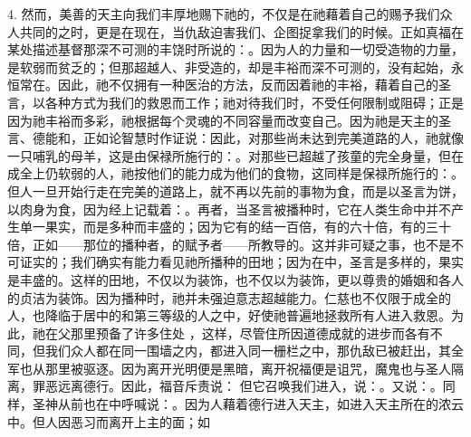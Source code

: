 4. 然而，美善的天主向我们丰厚地赐下祂的，不仅是在祂藉着自己的赐予我们众人共同的之时，更是在现在，当仇敌迫害我们、企图捉拿我们的时候。正如真福在某处描述基督那深不可测的丰饶时所说的：。因为人的力量和一切受造物的力量，是软弱而贫乏的；但那超越人、非受造的，却是丰裕而深不可测的，没有起始，永恒常在。因此，祂不仅拥有一种医治的方法，反而因着祂的丰裕，藉着自己的圣言，以各种方式为我们的救恩而工作；祂对待我们时，不受任何限制或阻碍；正是因为祂丰裕而多彩，祂根据每个灵魂的不同容量而改变自己。因为祂是天主的圣言、德能和，正如论智慧时作证说：因此，对那些尚未达到完美道路的人，祂就像一只哺乳的母羊，这是由保禄所施行的：。对那些已超越了孩童的完全身量，但在成全上仍软弱的人，祂按他们的能力成为他们的食物，这同样是保禄所施行的：。但人一旦开始行走在完美的道路上，就不再以先前的事物为食，而是以圣言为饼，以肉身为食，因为经上记载着：。再者，当圣言被播种时，它在人类生命中并不产生单一果实，而是多种而丰盛的；因为它有的结一百倍，有的六十倍，有的三十倍，正如——那位的播种者，的赋予者——所教导的。这并非可疑之事，也不是不可证实的；我们确实有能力看见祂所播种的田地；因为在中，圣言是多样的，果实是丰盛的。这样的田地，不仅以为装饰，也不仅以为装饰，更以尊贵的婚姻和各人的贞洁为装饰。因为播种时，祂并未强迫意志超越能力。仁慈也不仅限于成全的人，也降临于居中的和第三等级的人之中，好使祂普遍地拯救所有人进入救恩。为此，祂在父那里预备了许多住处 ，这样，尽管住所因道德成就的进步而各有不同，但我们众人都在同一围墙之内，都进入同一栅栏之中，那仇敌已被赶出，其全军也从那里被驱逐。因为离开光明便是黑暗，离开祝福便是诅咒，魔鬼也与圣人隔离，罪恶远离德行。因此，福音斥责说： 但它召唤我们进入，说：。又说：。同样，圣神从前也在中呼喊说：。因为人藉着德行进入天主，如进入天主所在的浓云中。但人因恶习而离开上主的面；如  
